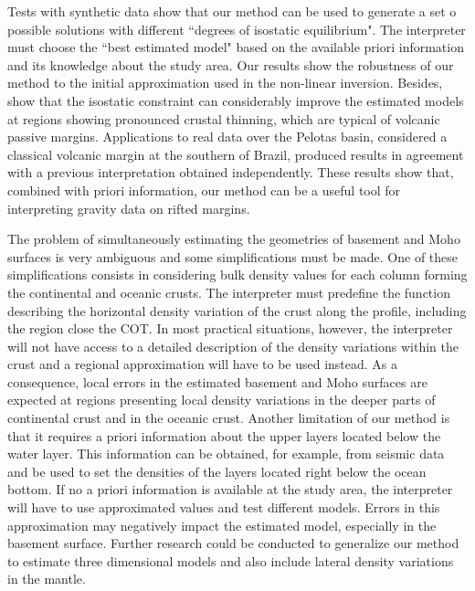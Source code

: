\documentclass[manuscript]{geophysics}
\begin{document}
Tests with synthetic data show that our method can be used to generate a set o possible 
solutions with different ``degrees of isostatic equilibrium". 
The interpreter must choose the ``best estimated model" based on the available priori 
information and its knowledge about the study area.
Our results show the robustness of our method to the initial approximation
used in the non-linear inversion. Besides, show that 
the isostatic constraint can considerably improve 
the estimated models at regions showing pronounced crustal thinning, which 
are typical of volcanic passive margins. 
Applications to real data over the Pelotas basin, considered a classical volcanic
margin at the southern of Brazil, produced results in agreement with a previous 
interpretation obtained independently.
These results show that, combined with priori information, our method can be a 
useful tool for interpreting gravity data on rifted margins.

The problem of simultaneously estimating the geometries of basement and Moho surfaces
is very ambiguous and some simplifications must be made. 
One of these simplifications consists in considering bulk density 
values for each column forming the continental and oceanic crusts. 
The interpreter must predefine the function describing the horizontal density
variation of the crust along the profile, including the region 
close the COT.
In most practical situations, however, the interpreter will not have access to a detailed
description of the density variations within the crust and a regional approximation
will have to be used instead.
As a consequence, local errors in the estimated basement and Moho surfaces are expected 
at regions presenting local density variations in the deeper parts of continental crust 
and in the oceanic crust.
Another limitation of our method is that it requires a priori information about the
upper layers located below the water layer.
This information can be obtained, for example, from seismic data and be used to set
the densities of the layers located right below the ocean bottom.
If no a priori information is available at the study area, the interpreter will have to use
approximated values and test different models.
Errors in this approximation may negatively impact the estimated model, especially in 
the basement surface.
Further research could be conducted to generalize our method to estimate
three dimensional models and also include lateral density variations in 
the mantle.
\end{document}
